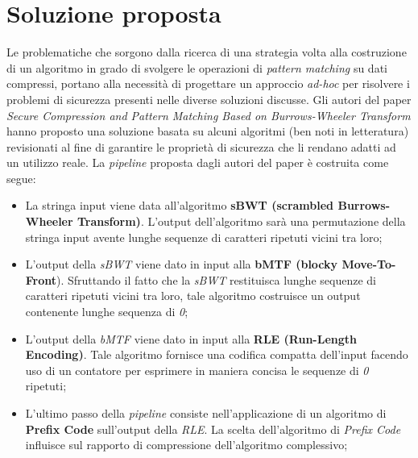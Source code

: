 {\section{Soluzione proposta} %
Le problematiche che sorgono dalla ricerca di una strategia volta alla costruzione di un algoritmo in grado di svolgere le operazioni di \emph{pattern matching} su dati compressi, portano alla necessità di progettare un approccio \emph{ad-hoc} per risolvere i problemi di sicurezza presenti nelle diverse soluzioni discusse. Gli autori del paper \emph{Secure Compression and Pattern Matching Based on Burrows-Wheeler Transform} \cite{zeng2018secure} hanno proposto una soluzione basata su alcuni algoritmi (ben noti in letteratura) revisionati al fine di garantire le proprietà di sicurezza che li rendano adatti ad un utilizzo reale. La \emph{pipeline} proposta dagli autori del paper \cite{zeng2018secure} è costruita come segue:
\begin{itemize}
    \item La stringa input viene data all'algoritmo \textbf{sBWT (scrambled Burrows-Wheeler Transform)}. L'output dell'algoritmo sarà una permutazione della stringa input avente lunghe sequenze di caratteri ripetuti vicini tra loro;
    \item L'output della \emph{sBWT} viene dato in input alla \textbf{bMTF (blocky Move-To-Front}). Sfruttando il fatto che la \emph{sBWT} restituisca lunghe sequenze di caratteri ripetuti vicini tra loro, tale algoritmo costruisce un output contenente lunghe sequenza di \emph{0}; 
    \item L'output della \emph{bMTF} viene dato in input alla \textbf{RLE (Run-Length Encoding)}. Tale algoritmo fornisce una codifica compatta dell'input facendo uso di un contatore per esprimere in maniera concisa le sequenze di \emph{0} ripetuti;
    \item L'ultimo passo della \emph{pipeline} consiste nell'applicazione di un algoritmo di \textbf{Prefix Code} sull'output della \emph{RLE}. La scelta dell'algoritmo di \emph{Prefix Code} influisce sul rapporto di compressione dell'algoritmo complessivo;
\end{itemize}
}
